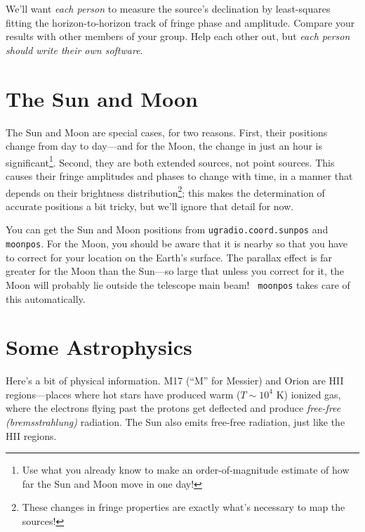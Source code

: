 \documentclass[11pt,preprint]{aastex}
\begin{document}
We'll want {\it each person} to measure the source's
declination by least-squares fitting the horizon-to-horizon track of
fringe phase and amplitude.  Compare your results with other members of
your group.  Help each other out, but {\it each person should write
 their own software}.

\section{The Sun and Moon}

\noindent
	The Sun and Moon are special cases, for two reasons. First, 
their positions change from day to day---and for the Moon, the change in
just an hour is significant\footnote{Use what you already know to make
an order-of-magnitude estimate of how far the Sun and Moon move in one
day!}.  Second, they are both extended sources, not point sources. This
causes their fringe amplitudes and phases to change with time, in a
manner that depends on their brightness distribution\footnote{These
changes in fringe properties are exactly what's necessary to map the
sources!}; this makes the determination of accurate positions a bit
tricky, but we'll ignore that detail for now.

	You can get the Sun and Moon positions from 
        {\tt ugradio.coord.sunpos} and {\tt moonpos}.  For the Moon, you should be aware
        that it is nearby so that you have to correct for your location
        on the Earth's surface. The parallax effect is far greater for
        the Moon than the Sun---so large that unless you correct for it,
        the Moon will probably lie outside the telescope main beam! {\tt
          moonpos} takes care of this automatically.

\section{Some Astrophysics}

\noindent
Here's a bit of physical information.  M17 (``M'' for Messier) and Orion
are HII regions---places where hot stars have produced warm ($T \sim
10^4$ K) ionized gas, where the electrons flying past the protons get
deflected and produce {\it free-free (bremsstrahlung)} radiation.  The
Sun also emits free-free radiation, just like the HII regions.
\end{document}

